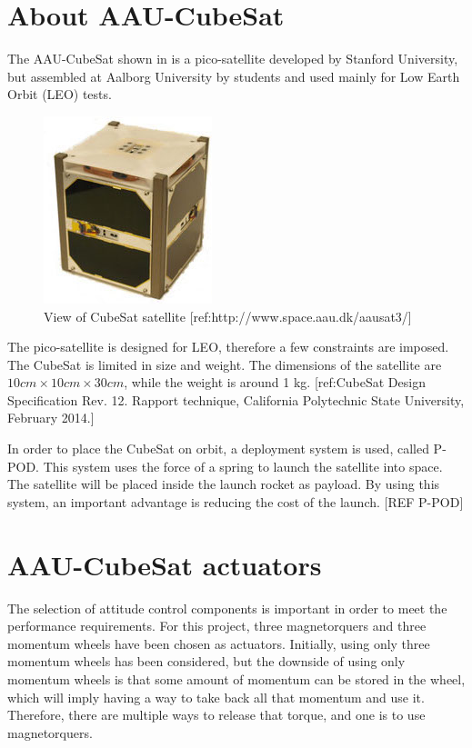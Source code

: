 \section{About AAU-CubeSat}
The AAU-CubeSat shown in  is a pico-satellite developed by Stanford University, but assembled at Aalborg University by students and used mainly for Low Earth Orbit (LEO)  tests.
\begin{figure}[H]
	\centering
	\includegraphics[width=0.3\linewidth]{figures/cub}
	\caption{View of CubeSat satellite [ref:http://www.space.aau.dk/aausat3/]}
	\label{fig:pico}
\end{figure}
The pico-satellite is designed for LEO, therefore a few constraints are imposed. The CubeSat is limited in size and weight. The dimensions of the satellite are $10cm\times10cm\times30cm$, while the weight is around 1 kg. [ref:CubeSat Design Specification Rev. 12. Rapport technique, California Polytechnic State University, February 2014.]

In order to place the CubeSat on orbit, a deployment system is used, called P-POD. This system uses the force of a spring to launch the satellite into space. The satellite will be placed inside the launch rocket as payload. By using this system, an important advantage is reducing the cost of the launch. [REF P-POD]
%
\section{AAU-CubeSat actuators}
The selection of attitude control components is important in order to meet the performance requirements. For this project, three magnetorquers and three momentum wheels have been chosen as actuators. Initially, using only three momentum wheels has been considered, but the downside of using only momentum wheels is that some amount of momentum can be stored in the wheel, which will imply having a way to take back all that momentum and use it. Therefore, there are multiple ways to release that torque, and one is to use magnetorquers. 

